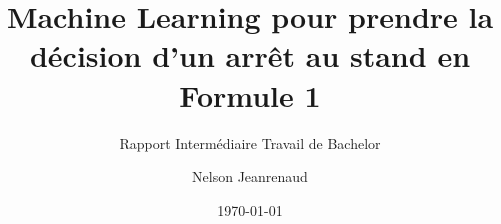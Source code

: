 \author{Nelson Jeanrenaud}


\title{Machine Learning pour prendre la décision d'un arrêt au stand en Formule 1}

\subtitle{Rapport Intermédiaire Travail de Bachelor}


\date{\today}


